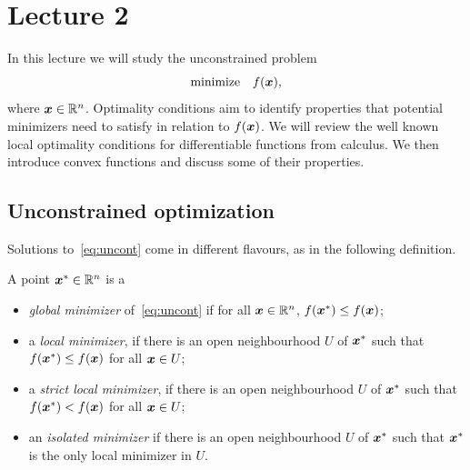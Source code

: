 %
%
% 


\chapter*{Lecture 2}
\setcounter{chapter}{2}
\setcounter{section}{0}
\setcounter{equation}{0}
\setcounter{theorem}{0}


In this lecture we will study the unconstrained problem
\begin{equation}\label{eq:uncont}
 \text{minimize}\quad f(\bm{x}),
\end{equation}
where $\bm{x}\in \mathbb{R}^n$. Optimality conditions aim to identify properties that potential minimizers need to satisfy in relation to $f(\bm{x})$. We will review the well known local optimality conditions for differentiable functions from calculus. We then introduce convex functions and discuss some of their properties.

\section{Unconstrained optimization}
Solutions to~\eqref{eq:uncont} come in different flavours, as in the following definition.

\begin{definition}
A point $\bm{x}^*\in \mathbb{R}^n$ is a
\begin{itemize}
 \item  {\em global minimizer} of~\eqref{eq:uncont} if for all $\bm{x}\in \mathbb{R}^n$, $f(\bm{x}^*)\leq f(\bm{x})$;
 \item a {\em local minimizer}, if there is an open neighbourhood $U$ of $\bm{x}^*$ such that $f(\bm{x}^*)\leq f(\bm{x})$ for all $\bm{x}\in U$;
 \item a {\em strict local minimizer}, if there is an open neighbourhood $U$ of $\bm{x}^*$ such that $f(\bm{x}^*)<f(\bm{x})$ for all $\bm{x}\in U$;
 \item an {\em isolated minimizer} if there is an open neighbourhood $U$ of $\bm{x}^*$ such that $\bm{x}^*$ is the only local minimizer in $U$.
 \end{itemize}
\end{definition}

